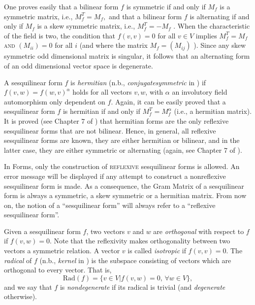 \documentclass[a4paper,11pt]{report}
\begin{document}
{{ One proves easily that a bilinear form $f$ is symmetric if and only if $M_f$  is a symmetric matrix, i.e., $M_f^T=M_f,$  and that a bilinear form $f$ is alternating if and only if  $M_f$ is a skew symmetric matrix, i.e., $M_f^T=-M_f$ . When the characteristic of the field is two, the condition that $f(v,v)=0$ for all $v \in V$ implies $M_f^T=M_f$  \textsc{and} $(M_{ii})=0$  for all $i$ (and where the matrix  $M_f = (M_{ij})$ ). Since any skew symmetric odd dimensional matrix is singular, it follows
that an alternating form of an odd dimensional vector space is degenerate. 

 A sesquilinear form $f$ is \emph{hermitian} (n.b., \emph{conjugate\texttt{}symmetric} in \cite{Atlas}) if $f(v,w)=f(w,v)^\alpha$  holds for all vectors $v,w$, with $\alpha$ an involutory field automorphism only dependent on $f$. Again, it can be easily proved that a sesquilinear form $f$ is hermitian if and only if  $M_f^T = M_f^{\alpha}$  (i.e., a hermitian matrix). It is proved (see Chapter 7 of \cite{Taylor}) that hermitian forms are the only reflexive sesquilinear forms that are not
bilinear. Hence, in general, all reflexive sesquilinear forms are known, they
are either hermitian or bilinear, and in the latter case, they are either
symmetric or alternating (again, see Chapter 7 of \cite{Taylor}). 

 In \textsf{Forms}, only the construction of \textsc{reflexive} sesquilinear forms is allowed. An error message will be displayed if any
attempt to construct a non\texttt{}reflexive sesquilinear form is
made. As a consequence, the Gram Matrix of a sesquilinear form is always a
symmetric, a skew symmetric or a hermitian matrix. From now on, the notion of
a ``sesquilinear form'' will always refer to a ``reflexive sesquilinear
form''. 

 Given a sesquilinear form $f$, two vectors $v$ and $w$ are \emph{orthogonal} with respect to $f$ if $f(v,w) = 0$. Note that the reflexivity makes orthogonality between two vectors a
symmetric relation. A vector $v$ is called \emph{isotropic} if $f(v,v)=0$. The \emph{radical} of $f$ (n.b., \emph{kernel} in \cite{Atlas}) is the subspace consisting of vectors which are orthogonal to every vector.
That is,  
\[\mathrm{Rad}(f) = \{v \in V | f(v,w) = 0,\, \forall w \in V\},\]
   and we say that $f$ is \emph{non\texttt{}degenerate} if its radical is trivial (and \emph{degenerate} otherwise). 

}}
\end{document}
